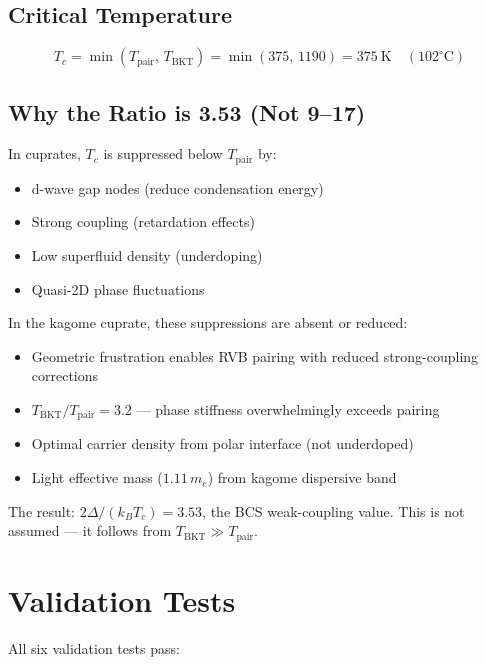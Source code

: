 \documentclass[11pt, a4paper]{article}
\begin{document}
\subsection{Critical Temperature}

\begin{equation}
  \boxed{T_c = \min(T_{\text{pair}},\, T_{\text{BKT}})
    = \min(375,\, 1190) = 375~\text{K} \quad (102^\circ\text{C})}
\end{equation}

\subsection{Why the Ratio is 3.53 (Not 9--17)}

In cuprates, $T_c$ is suppressed below $T_{\text{pair}}$ by:
\begin{itemize}[nosep]
  \item d-wave gap nodes (reduce condensation energy)
  \item Strong coupling (retardation effects)
  \item Low superfluid density (underdoping)
  \item Quasi-2D phase fluctuations
\end{itemize}

In the kagome cuprate, these suppressions are absent or reduced:
\begin{itemize}[nosep]
  \item Geometric frustration enables RVB pairing with reduced
        strong-coupling corrections
  \item $T_{\text{BKT}}/T_{\text{pair}} = 3.2$ --- phase stiffness
        overwhelmingly exceeds pairing
  \item Optimal carrier density from polar interface (not underdoped)
  \item Light effective mass ($1.11\,m_e$) from kagome dispersive band
\end{itemize}

The result: $2\Delta/(k_B T_c) = 3.53$, the BCS weak-coupling
value. This is not assumed --- it follows from
$T_{\text{BKT}} \gg T_{\text{pair}}$.

\section{Validation Tests}

All six validation tests pass:
\end{document}
